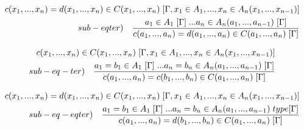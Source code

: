 \documentclass[10pt,a4paper, italian]{book}
\begin{document}
{{{\begin{equation}
\begin{split}
c(x_1,...,x_n) = d(x_1,...,x_n)  \in C(x_1,...,x_n) \hspace{0.1cm}[\Gamma, x_1 \in A_1,...,x_n \in A_n(x_1,...,x_{n-1})] \\ sub-eqter) \quad \frac{a_1 \in A_1\hspace{0.1cm}[\Gamma]\hspace{0.1cm}...a_n \in A_n(a_1,...,a_{n-1})\hspace{0.1cm}[\Gamma]}{ c(a_1,...,a_n) = d(a_1,...,a_n) \in C(a_1,...,a_n)\hspace{0.1cm}[\Gamma]}
\end{split}
\end{equation}

\begin{equation}
\begin{split}
c(x_1,...,x_n) \in C(x_1,...,x_n) \hspace{0.1cm}[\Gamma, x_1 \in A_1,...,x_n \in A_n(x_1,...,x_{n-1})] \\ sub-eq-ter) \quad \frac{a_1 = b_1 \in A_1\hspace{0.1cm}[\Gamma]\hspace{0.1cm}...a_n = b_n \in A_n(a_1,...,a_{n-1})\hspace{0.1cm}[\Gamma]}{ c(a_1,...,a_n) = c(b_1,...,b_n) \in C(a_1,...,a_n)\hspace{0.1cm}[\Gamma]}
\end{split}
\end{equation}

\begin{equation}
\begin{split}
c(x_1,...,x_n) = d(x_1,...,x_n) \in C(x_1,...,x_n) \hspace{0.1cm}[\Gamma, x_1 \in A_1,...,x_n \in A_n(x_1,...,x_{n-1})] \\ sub-eq-eqter) \quad \frac{a_1 = b_1 \in A_1\hspace{0.1cm}[\Gamma]\hspace{0.1cm}...a_n = b_n \in A_n(a_1,...,a_{n-1})\hspace{0.1cm}type[\Gamma]}{ c(a_1,...,a_n) = d(b_1,...,b_n) \in C(a_1,...,a_n)\hspace{0.1cm}[\Gamma]}
\end{split}
\end{equation}

}}}
\end{document}
